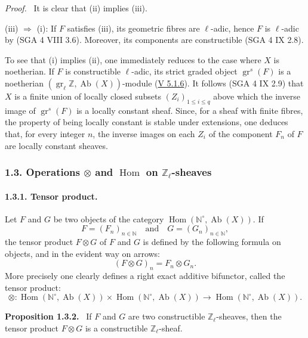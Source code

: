 \documentclass[11pt]{article}
\newenvironment{statement}[1]{\par\medskip\noindent\textbf{#1.}\ }{\par\medskip}
\newenvironment{prooftext}[1][Proof]{\par\noindent\emph{#1.}\ }{\par\medskip}
\DeclareMathOperator{\Hom}{Hom}
\providecommand{\Hom}{\operatorname{Hom}}
\providecommand{\Ab}{\operatorname{Ab}}
\providecommand{\Ab}{\operatorname{Ab}}
\providecommand{\Hom}{\operatorname{Hom}}
\begin{document}
\begin{prooftext}[Proof]
It is clear that (ii) implies (iii).

(iii) \(\Longrightarrow\) (i): If \(F\) satisfies (iii), its geometric fibres are \(\ell\)-adic, hence \(F\) is \(\ell\)-adic by (SGA 4 VIII 3.6). Moreover, its components are constructible (SGA 4 IX 2.8).

To see that (i) implies (ii), one immediately reduces to the case where \(X\) is noetherian. If \(F\) is constructible \(\ell\)-adic, its strict graded object \(\operatorname{gr}^s(F)\) is a noetherian \((\operatorname{gr}_\ell\mathbb Z,\Ab(X))\)-module (\hyperref[sga5:V:proposition:5.1.6]{V 5.1.6}). It follows (SGA 4 IX 2.9) that \(X\) is a finite union of locally closed subsets \((Z_i)_{1\le i\le q}\) above which the inverse image of \(\operatorname{gr}^s(F)\) is a locally constant sheaf. Since, for a sheaf with finite fibres, the property of being locally constant is stable under extensions, one deduces that, for every integer \(n\), the inverse images on each \(Z_i\) of the component \(F_n\) of \(F\) are locally constant sheaves.
\end{prooftext}

\subsubsection*{1.3. Operations \(\otimes\) and \(\Hom\) on \(\mathbb Z_\ell\)-sheaves}\label{sga5:VI:subsubsection:1.3}

\paragraph{1.3.1. Tensor product.}\label{sga5:VI:paragraph:1.3.1}
Let \(F\) and \(G\) be two objects of the category \(\Hom(\mathbb N^\circ,\Ab(X))\). If
\[
F=(F_n)_{n\in\mathbb N}\quad\text{and}\quad G=(G_n)_{n\in\mathbb N},
\]
the tensor product \(F\otimes G\) of \(F\) and \(G\) is defined by the following formula on objects, and in the evident way on arrows:
\[
(F\otimes G)_n=F_n\otimes G_n.
\]
More precisely one clearly defines a right exact additive bifunctor, called the tensor product:
\[
\otimes:\Hom(\mathbb N^\circ,\Ab(X))\times \Hom(\mathbb N^\circ,\Ab(X))
\longrightarrow \Hom(\mathbb N^\circ,\Ab(X)).
\]

\label{sga5:VI:proposition:1.3.2}\begin{statement}{Proposition 1.3.2}
If \(F\) and \(G\) are two constructible \(\mathbb Z_\ell\)-sheaves, then the tensor product \(F\otimes G\) is a constructible \(\mathbb Z_\ell\)-sheaf.
\end{statement}
\end{document}
